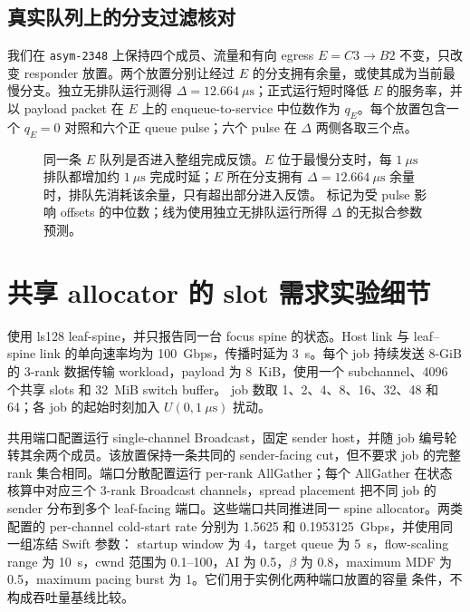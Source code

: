 \section{真实队列上的分支过滤核对}
\label{app:cc-slack}

我们在 \texttt{asym-2348} 上保持四个成员、流量和有向 egress
$E=C3\rightarrow B2$ 不变，只改变 responder 放置。两个放置分别让经过
$E$ 的分支拥有余量，或使其成为当前最慢分支。独立无排队运行测得
$\Delta=12.664~\mu\mathrm{s}$；正式运行短时降低 $E$ 的服务率，并以 payload
packet 在 $E$ 上的 enqueue-to-service 中位数作为 $q_E$。每个放置包含一个
$q_E=0$ 对照和六个正 queue pulse；六个 pulse 在 $\Delta$ 两侧各取三个点。

\begin{figure}[t]
\centering

\caption{同一条 $E$ 队列是否进入整组完成反馈。$E$ 位于最慢分支时，每
$1~\mu\mathrm{s}$ 排队都增加约 $1~\mu\mathrm{s}$ 完成时延；$E$ 所在分支拥有
$\Delta=12.664~\mu\mathrm{s}$ 余量时，排队先消耗该余量，只有超出部分进入反馈。
标记为受 pulse 影响 offsets 的中位数；线为使用独立无排队运行所得
$\Delta$ 的无拟合参数预测。}
\label{fig:cc-slack}
\end{figure}

\chapter{共享 allocator 的 slot 需求实验细节}
\label{app:state-depth}

 使用 ls128 leaf-spine，并只报告同一台 focus spine
的状态。Host link 与 leaf--spine link 的单向速率均为 100~Gbps，传播时延为
3~\textmu s。每个 job 持续发送 8-GiB 的 3-rank 数据传输 workload，payload
为 8~KiB，使用一个 subchannel、4096 个共享 slots 和 32~MiB switch buffer。
job 数取 1、2、4、8、16、32、48 和 64；各 job 的起始时刻加入
$U(0,1~\mu\mathrm{s})$ 扰动。

共用端口配置运行 single-channel Broadcast，固定 sender host，并随 job
编号轮转其余两个成员。该放置保持一条共同的 sender-facing cut，但不要求
job 的完整 rank 集合相同。端口分散配置运行 per-rank AllGather；每个
AllGather 在状态核算中对应三个 3-rank Broadcast channels，spread placement
把不同 job 的 sender 分布到多个 leaf-facing 端口。这些端口共同推进同一
spine allocator。两类配置的 per-channel cold-start rate 分别为
1.5625 和 0.1953125~Gbps，并使用同一组冻结 Swift 参数：
startup window 为 4，target queue 为 5~\textmu s，flow-scaling range 为
10~\textmu s，cwnd 范围为 0.1--100，AI 为 0.5，$\beta$ 为 0.8，maximum
MDF 为 0.5，maximum pacing burst 为 1。它们用于实例化两种端口放置的容量
条件，不构成吞吐量基线比较。

